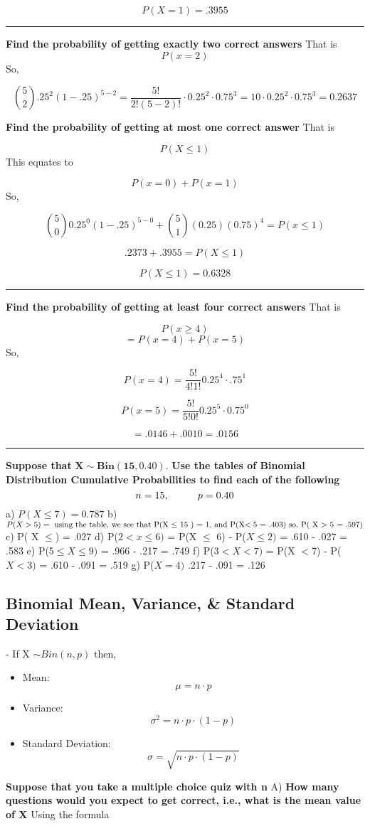 \documentclass{report}
\begin{document}
$$ P(X = 1) = .3955$$ 
\bigbreak \noindent
\hrule
\bigbreak \noindent
\textbf{Find the probability of getting exactly two correct answers}
\bigbreak \noindent
That is
$$P(x = 2)$$
So,

$${5 \choose 2}.25^2(1-.25)^{5-2} = \frac{5!}{2!(5-2)!}  \cdot 0.25^2 \cdot 0.75^3 = 10 \cdot 0.25^2 \cdot 0.75^3 = 0.2637$$

\pagebreak
\noindent
\textbf{Find the probability of getting at most one correct answer}
\bigbreak \noindent
That is

$$ P(X \le 1)$$ 
This equates to

$$ P(x=0) + P(x=1)$$
So,

$${5 \choose 0}0.25^0(1-.25)^{5-0} + {5 \choose 1}(0.25)(0.75)^4 = P(x \le 1)$$

$$ .2373 + .3955 = P(X \le 1)$$

$$ P(X \le 1) = 0.6328$$
\bigbreak \noindent
\hrule
\bigbreak \noindent
\textbf{Find the probability of getting at least four correct answers}
\bigbreak \noindent
That is

$$ P(x\ge 4) $$
$$= P(x=4) + P(x=5)$$
So,

$$ P(x=4) = \frac{5!}{4!1!}0.25^4 \cdot .75^1$$

$$P(x=5) = \frac{5!}{5!0!}0.25^5\cdot0.75^0$$

$$ = .0146 + .0010 = .0156$$
\bigbreak \noindent
\hrule
\bigbreak \noindent
\q
\bigbreak \noindent
\textbf{Suppose that} $\mathbf{X \sim Bin(15,0.40)}$. \textbf{Use the tables of Binomial Distribution Cumulative Probabilities to find each of the following}
  $$ n = 15, \hspace{10mm} p = 0.40$$
  \bigbreak \noindent
a) $P(X \le 7) = 0. 787$
\bigbreak \noindent
b) $P(X >  5) = \text{ using the table, we see that P(X $\le$ 15 ) = 1, and P(X$ < 5$ = .403) so, P( X $>$ 5 = .597)}$
\bigbreak \noindent
c) P( X $ \le $) = .027
\bigbreak \noindent
d) P($2 < x \le 6)$ = P(X $\le$  6) - P($ X \le 2)$ = .610 - .027 = .583
\bigbreak \noindent
e) P($ 5 \le X \le 9)$ = .966 - .217 = .749
\bigbreak \noindent
f) P($ 3 < X < 7)$ = P(X $< $7) - P($ X < 3)$ = .610 - .091 = .519
\bigbreak \noindent
g) P($X = 4)$ .217 - .091 = .126
\bigbreak \noindent
\bigbreak \noindent
\subsection*{Binomial Mean, Variance, \& Standard Deviation} - If X $\sim Bin(n,p)$ then,
\begin{itemize}
  \item Mean: 
    $$ \mu = n\cdot p$$
  \item Variance:
    $$ \sigma^2 = n\cdot p \cdot (1-p)$$
  \item Standard Deviation:
    $$ \sigma = \sqrt{n\cdot p \cdot (1-p)}$$
\end{itemize}
\q
\bigbreak \noindent
\textbf{Suppose that you take a multiple choice quiz with n }
\bigbreak \noindent
A) \textbf{How many questions would you expect to get correct, i.e., what is the mean value of X}
\bigbreak \noindent
Using the formula
\end{document}

